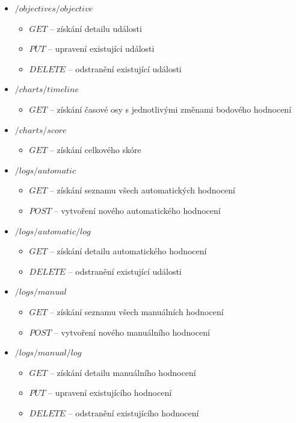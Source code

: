 \documentclass[
  digital, %
  twoside, %
  table,   %
  nolof,     %
  nolot,     %
]{fithesis3}
\begin{document}
\begin{itemize}
    \item $/objectives/{objective}$
    \begin{itemize}
        \item $GET$ -- získání detailu události
        \item $PUT$ -- upravení existující události
        \item $DELETE$ -- odstranění existující události
    \end{itemize}
        
    \item $/charts/timeline$
    \begin{itemize}
        \item $GET$ -- získání časové osy s jednotlivými změnami bodového hodnocení
    \end{itemize}
        
    \item $/charts/score$
    \begin{itemize}
        \item $GET$ -- získání celkového skóre
    \end{itemize}
        
    \item $/logs/automatic$
    \begin{itemize}
        \item $GET$ -- získání seznamu všech automatických hodnocení
        \item $POST$ --  vytvoření nového automatického hodnocení
    \end{itemize}
        
    \item $/logs/automatic/{log}$
    \begin{itemize}
        \item $GET$ -- získání detailu automatického hodnocení
        \item $DELETE$ -- odstranění existující události
    \end{itemize}
            
    \item $/logs/manual$
    \begin{itemize}
        \item $GET$ -- získání seznamu všech manuálních hodnocení
        \item $POST$ --  vytvoření nového manuálního hodnocení
    \end{itemize}
            
    \item $/logs/manual/{log}$
    \begin{itemize}
        \item $GET$ -- získání detailu manuálního hodnocení
        \item $PUT$ -- upravení existujícího hodnocení
        \item $DELETE$ -- odstranění existujícího hodnocení
    \end{itemize}
            

\end{itemize}
\end{document}
